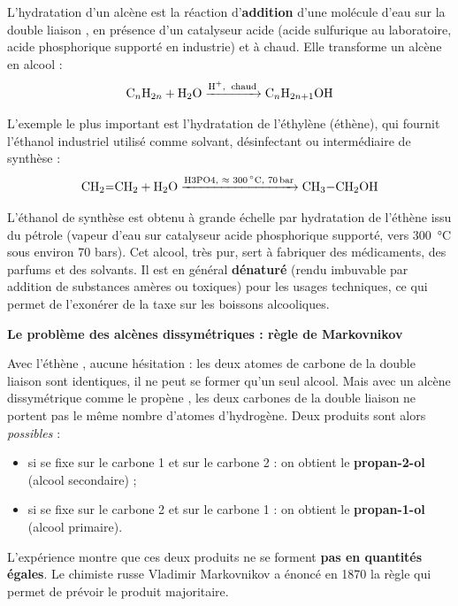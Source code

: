 \documentclass[11pt]{article}
\newcommand{\cle}[1]{{\popxbold\color{popdark}#1}}
\begin{document}
\begin{definition}
L'\cle{hydratation} d'un alcène est la réaction d'\textbf{addition} d'une molécule d'eau sur la double liaison , en présence d'un catalyseur acide (acide sulfurique  au laboratoire, acide phosphorique  supporté en industrie) et à chaud. Elle transforme un alcène en alcool :
\[ \ce{C_nH_{2n} + H2O ->[H+,\ \text{chaud}] C_nH_{2n+1}OH} \]
\end{definition}

L'exemple le plus important est l'hydratation de l'éthylène (éthène), qui fournit l'éthanol \og industriel \fg{} utilisé comme solvant, désinfectant ou intermédiaire de synthèse :
\[ \ce{CH2=CH2 + H2O ->[{H3PO4, $\approx$ \SI{300}{\celsius}, \SI{70}{bar}}] CH3-CH2OH} \]

\begin{exemplebox}
L'éthanol de synthèse est obtenu à grande échelle par hydratation de l'éthène issu du pétrole (vapeur d'eau sur catalyseur acide phosphorique supporté, vers \SI{300}{\celsius} sous environ 70 bars). Cet alcool, très pur, sert à fabriquer des médicaments, des parfums et des solvants. Il est en général \textbf{dénaturé} (rendu imbuvable par addition de substances amères ou toxiques) pour les usages techniques, ce qui permet de l'exonérer de la taxe sur les boissons alcooliques.
\end{exemplebox}

\textbf{Le problème des alcènes dissymétriques : règle de Markovnikov}\par

Avec l'éthène , aucune hésitation : les deux atomes de carbone de la double liaison sont identiques, il ne peut se former qu'un seul alcool. Mais avec un alcène \cle{dissymétrique} comme le propène , les deux carbones de la double liaison ne portent pas le même nombre d'atomes d'hydrogène. Deux produits sont alors \emph{possibles} :

\begin{itemize}
\item si  se fixe sur le carbone 1 et  sur le carbone 2 : on obtient le \textbf{propan-2-ol} (alcool secondaire) ;
\item si  se fixe sur le carbone 2 et  sur le carbone 1 : on obtient le \textbf{propan-1-ol} (alcool primaire).
\end{itemize}

L'expérience montre que ces deux produits ne se forment \textbf{pas en quantités égales}. Le chimiste russe Vladimir Markovnikov a énoncé en 1870 la règle qui permet de prévoir le produit majoritaire.
\end{document}
